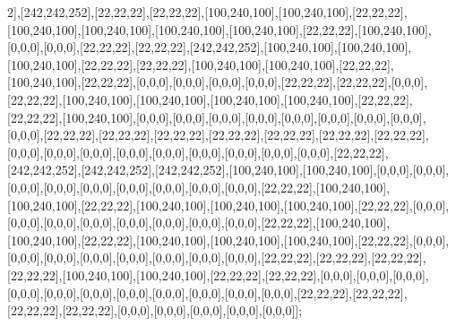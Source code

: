 2],[242,242,252],[22,22,22],[22,22,22],[100,240,100],[100,240,100],[22,22,22],[100,240,100],[100,240,100],[100,240,100],[100,240,100],[22,22,22],[100,240,100],[0,0,0],[0,0,0],[22,22,22],[22,22,22],[242,242,252],[100,240,100],[100,240,100],[100,240,100],[22,22,22],[22,22,22],[100,240,100],[100,240,100],[22,22,22],[100,240,100],[22,22,22],[0,0,0],[0,0,0],[0,0,0],[0,0,0],[22,22,22],[22,22,22],[0,0,0],[22,22,22],[100,240,100],[100,240,100],[100,240,100],[100,240,100],[22,22,22],[22,22,22],[100,240,100],[0,0,0],[0,0,0],[0,0,0],[0,0,0],[0,0,0],[0,0,0],[0,0,0],[0,0,0],[0,0,0],[22,22,22],[22,22,22],[22,22,22],[22,22,22],[22,22,22],[22,22,22],[22,22,22],[0,0,0],[0,0,0],[0,0,0],[0,0,0],[0,0,0],[0,0,0],[0,0,0],[0,0,0],[0,0,0],[22,22,22],[242,242,252],[242,242,252],[242,242,252],[100,240,100],[100,240,100],[0,0,0],[0,0,0],[0,0,0],[0,0,0],[0,0,0],[0,0,0],[0,0,0],[0,0,0],[0,0,0],[22,22,22],[100,240,100],[100,240,100],[22,22,22],[100,240,100],[100,240,100],[100,240,100],[22,22,22],[0,0,0],[0,0,0],[0,0,0],[0,0,0],[0,0,0],[0,0,0],[0,0,0],[0,0,0],[22,22,22],[100,240,100],[100,240,100],[22,22,22],[100,240,100],[100,240,100],[100,240,100],[22,22,22],[0,0,0],[0,0,0],[0,0,0],[0,0,0],[0,0,0],[0,0,0],[0,0,0],[0,0,0],[22,22,22],[22,22,22],[22,22,22],[22,22,22],[100,240,100],[100,240,100],[22,22,22],[22,22,22],[0,0,0],[0,0,0],[0,0,0],[0,0,0],[0,0,0],[0,0,0],[0,0,0],[0,0,0],[0,0,0],[0,0,0],[0,0,0],[22,22,22],[22,22,22],[22,22,22],[22,22,22],[0,0,0],[0,0,0],[0,0,0],[0,0,0],[0,0,0]];

